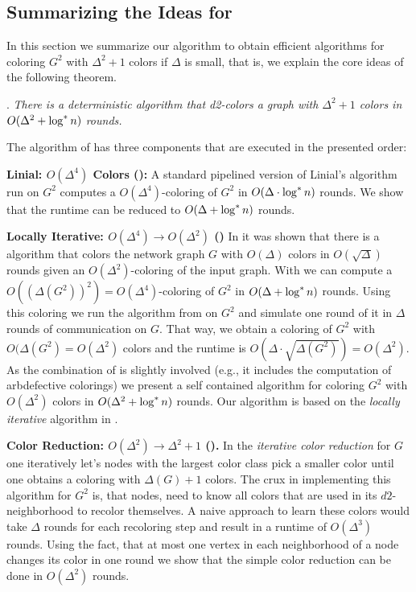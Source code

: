 \subsection{Summarizing the Ideas for  }
\label{ssec:sumDeltaDeta}
In this section we summarize our algorithm to obtain efficient algorithms for coloring $G^2$ with $\Delta^2+1$ colors if $\Delta$ is small, that is, we explain the core ideas of the following theorem.


\smallskip
\textsc{.} 
\emph{There is a deterministic \CONGEST algorithm that d2-colors a graph with $\Delta^2+1$ colors in $O(\Delta^2+\log^* n)$ rounds.}
\smallskip

The algorithm of  has three components that are executed in the presented order:

\smallskip

\noindent\textbf{ Linial: $O(\Delta^4)$ Colors ():}  A standard pipelined version of Linial's algorithm run on $G^2$ computes a $O(\Delta^4)$-coloring of $G^2$ in $O(\Delta\cdot \log^* n)$ rounds. We show that the runtime can be reduced to $O(\Delta+\log^* n)$ rounds. 

\smallskip

\noindent\textbf{Locally Iterative: $O(\Delta^4)\rightarrow O(\Delta^2)$  () } In \cite{barenboim15,BEG18} it was shown that there is a {\congest} algorithm that colors the network graph $G$ with $O(\Delta)$ colors in $O(\sqrt{\Delta})$ rounds given an $O(\Delta^2)$-coloring of the input graph. With  we can compute a $O((\Delta(G^2))^2)=O(\Delta^4)$-coloring of $G^2$ in $O(\Delta+\log^* n)$ rounds. Using this coloring we run the algorithm from \cite{barenboim15,BEG18} on $G^2$ and simulate one round of it in $\Delta$ rounds of communication on $G$. That way, we obtain a coloring of $G^2$ with $O(\Delta(G^2)=O(\Delta^2)$ colors and the runtime is $O(\Delta\cdot \sqrt{\Delta(G^2)})=O(\Delta^2)$.  
As the combination of \cite{barenboim15,BEG18} is slightly involved (e.g., it includes the computation of arbdefective colorings) we present a self contained algorithm for coloring $G^2$ with $O(\Delta^2)$ colors in $O(\Delta^2+\log^* n)$ rounds. Our algorithm is based on the \emph{locally iterative} algorithm in \cite{BEG18}. 

\smallskip

\noindent\textbf{Color Reduction: $O(\Delta^2)\rightarrow \Delta^2+1$ ().} In the \emph{iterative color reduction} for $G$ one iteratively let's nodes with the largest color class pick a smaller color until one obtains a coloring with $\Delta(G)+1$ colors. The crux in implementing this algorithm for $G^2$ is, that nodes, need to know all colors that are used in its $d2$-neighborhood to recolor themselves. A naive approach to learn these colors would take $\Delta$ rounds for each recoloring step and result in a runtime of $O(\Delta^3)$ rounds. Using the fact, that at most one vertex in each neighborhood of a node changes its color in one round we show that the simple color reduction can be done in $O(\Delta^2)$ rounds.
